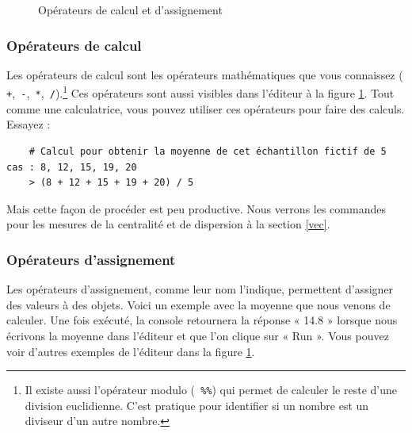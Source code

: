 \documentclass[10.5pt,a4paper]{article}
\newcommand{\rcode}[1]{\texttt{\color{rstudio} #1}}
\begin{document}
 \begin{figure}[H]
    \centering
    \caption{Opérateurs de calcul et d'assignement}
    \label{opeAssign}
    \end{figure}
  
    \subsubsection{Opérateurs de calcul}
    Les opérateurs de calcul sont les opérateurs mathématiques que vous connaissez (\rcode{+},\rcode{-},\rcode{*},\rcode{/}).\footnote{Il existe aussi l'opérateur modulo (\rcode{\%\%}) qui permet de calculer le reste d'une division euclidienne. C'est pratique pour identifier si un nombre est un diviseur d'un autre nombre.} Ces opérateurs sont aussi visibles dans l'éditeur à la figure \ref{opeAssign}. Tout comme une calculatrice, vous pouvez utiliser ces opérateurs pour faire des calculs. Essayez :
    
  \begin{lstlisting}
    # Calcul pour obtenir la moyenne de cet échantillon fictif de 5 cas : 8, 12, 15, 19, 20
    > (8 + 12 + 15 + 19 + 20) / 5
  \end{lstlisting}

Mais cette façon de procéder est peu productive. Nous verrons les commandes pour les mesures de la centralité et de dispersion à la section \ref{vec}.

    \subsubsection{Opérateurs d'assignement}
    Les opérateurs d'assignement, comme leur nom l'indique, permettent d'assigner des valeurs à des objets. Voici un exemple avec la moyenne que nous venons de calculer. Une fois exécuté, la console retournera la réponse « 14.8 » lorsque nous écrivons la moyenne dans l'éditeur et que l'on clique sur « Run ». Vous pouvez voir d'autres exemples de l'éditeur dans la figure \ref{opeAssign}.
    
\end{document}

